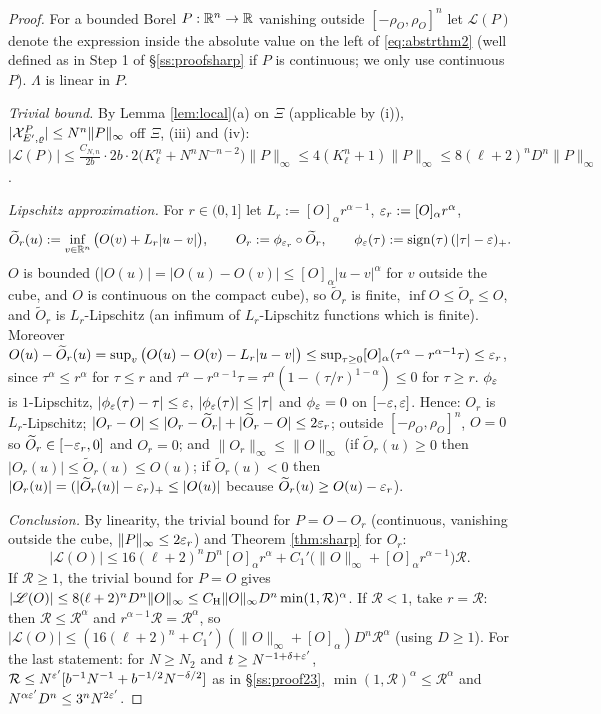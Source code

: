 \begin{proof}
For a bounded Borel $P:\mathbb{R}^n\to\mathbb{R}$ vanishing outside $[-\rho_O,\rho_O]^n$ let $\mathscr L(P)$ denote the expression inside the absolute value on the left of \eqref{eq:abstrthm2} (well defined as in Step 1 of \S\ref{ss:proofsharp} if $P$ is continuous; we only use continuous $P$). $\Lambda$ is linear in $P$.

\emph{Trivial bound.} By Lemma \ref{lem:local}(a) on $\Xi$ (applicable by (i)), $|\mathcal{X}^P_{E',\varrho}|\le N^n\|P\|_\infty$ off $\Xi$, (iii) and (iv):
$|\mathscr L(P)|\le\frac{C_{N,n}}{2b}\cdot2b\cdot2\big(K_\ell^n+N^nN^{-n-2}\big)\|P\|_\infty\le4(K_\ell^n+1)\|P\|_\infty\le8(\ell+2)^nD^n\|P\|_\infty$.

\emph{Lipschitz approximation.} For $r\in(0,1]$ let $L_r:=[O]_\alpha r^{\alpha-1}$, $\varepsilon_r:=[O]_\alpha r^\alpha$,
\[
\widetilde O_r(u):=\inf_{v\in\mathbb{R}^n}\big(O(v)+L_r|u-v|\big),\qquad O_r:=\phi_{\varepsilon_r}\circ\widetilde O_r,\qquad\phi_\varepsilon(\tau):=\operatorname{sign}(\tau)\,(|\tau|-\varepsilon)_+ .
\]
$O$ is bounded ($|O(u)|=|O(u)-O(v)|\le[O]_\alpha|u-v|^\alpha$ for $v$ outside the cube, and $O$ is continuous on the compact cube), so $\widetilde O_r$ is finite, $\inf O\le\widetilde O_r\le O$, and $\widetilde O_r$ is $L_r$-Lipschitz (an infimum of $L_r$-Lipschitz functions which is finite).
Moreover $O(u)-\widetilde O_r(u)=\sup_v\big(O(u)-O(v)-L_r|u-v|\big)\le\sup_{\tau\ge0}[O]_\alpha(\tau^\alpha-r^{\alpha-1}\tau)\le\varepsilon_r$, since $\tau^\alpha\le r^\alpha$ for $\tau\le r$ and $\tau^\alpha-r^{\alpha-1}\tau=\tau^\alpha(1-(\tau/r)^{1-\alpha})\le0$ for $\tau\ge r$.
$\phi_\varepsilon$ is $1$-Lipschitz, $|\phi_\varepsilon(\tau)-\tau|\le\varepsilon$, $|\phi_\varepsilon(\tau)|\le|\tau|$ and $\phi_\varepsilon=0$ on $[-\varepsilon,\varepsilon]$. Hence: $O_r$ is $L_r$-Lipschitz; $|O_r-O|\le|O_r-\widetilde O_r|+|\widetilde O_r-O|\le2\varepsilon_r$; outside $[-\rho_O,\rho_O]^n$, $O=0$ so $\widetilde O_r\in[-\varepsilon_r,0]$ and $O_r=0$; and $\|O_r\|_\infty\le\|O\|_\infty$ (if $\widetilde O_r(u)\ge0$ then $|O_r(u)|\le\widetilde O_r(u)\le O(u)$; if $\widetilde O_r(u)<0$ then $|O_r(u)|=(|\widetilde O_r(u)|-\varepsilon_r)_+\le|O(u)|$ because $\widetilde O_r(u)\ge O(u)-\varepsilon_r$).

\emph{Conclusion.} By linearity, the trivial bound for $P=O-O_r$ (continuous, vanishing outside the cube, $\|P\|_\infty\le2\varepsilon_r$) and Theorem \ref{thm:sharp} for $O_r$:
\[
|\mathscr L(O)|\le16(\ell+2)^nD^n[O]_\alpha r^\alpha+C_1'\big(\|O\|_\infty+[O]_\alpha r^{\alpha-1}\big)\mathcal R .
\]
If $\mathcal R\ge1$, the trivial bound for $P=O$ gives $|\mathscr L(O)|\le8(\ell+2)^nD^n\|O\|_\infty\le C_{\rm H}\|O\|_\infty D^n\min(1,\mathcal R)^\alpha$. If $\mathcal R<1$, take $r=\mathcal R$: then $\mathcal R\le\mathcal R^\alpha$ and $r^{\alpha-1}\mathcal R=\mathcal R^\alpha$, so $|\mathscr L(O)|\le(16(\ell+2)^n+C_1')(\|O\|_\infty+[O]_\alpha)D^n\mathcal R^\alpha$ (using $D\ge1$).
For the last statement: for $N\ge N_2$ and $t\ge N^{-1+\delta+\varepsilon'}$, $\mathcal R\le N^{\varepsilon'}[b^{-1}N^{-1}+b^{-1/2}N^{-\delta/2}]$ as in \S\ref{ss:proof23}, $\min(1,\mathcal R)^\alpha\le\mathcal R^\alpha$ and $N^{\alpha\varepsilon'}D^n\le3^nN^{2\varepsilon'}$.
\end{proof}

